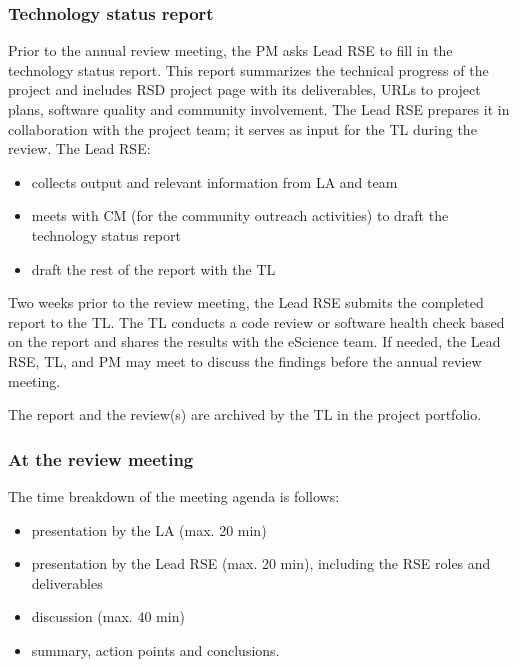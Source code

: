 \subsubsection{Technology status report}
\label{sec:exec:tech}
Prior to the annual review meeting, the PM asks Lead RSE to fill in the technology status report. This report 
summarizes the technical progress of the project and includes RSD project page with its deliverables, URLs
to project plans, software quality and community involvement. The Lead RSE prepares it in collaboration with the project team; it serves as input for the TL during the review. 
%
The Lead RSE:
\begin{itemize}\itemsep0em
\item collects output and relevant information from LA and team
\item meets with CM (for the community outreach activities) to draft the technology status report  
\item draft the rest of the report with the TL
\end{itemize}

Two weeks prior to the review meeting, the Lead RSE submits the completed report to the TL. The TL conducts a code 
review or software health check based on the report and shares the results with the eScience team. If needed, 
the Lead RSE, TL, and PM may meet to discuss the findings before the annual review meeting.

The report and the review(s) are archived by the TL in the project portfolio.

\subsubsection{At the review meeting}
The time breakdown of the meeting agenda is follows:
\begin{itemize}\itemsep0em
\item presentation by the LA (max. 20 min)
\item presentation by the Lead RSE (max. 20 min), including the RSE roles and deliverables
\item discussion (max. 40 min)
\item summary, action points and conclusions.
\end{itemize}

